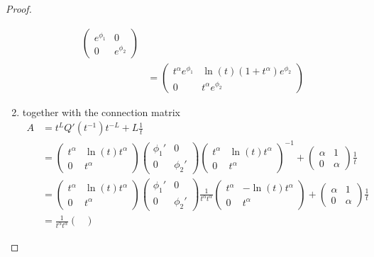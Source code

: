 \begin{proof}
\begin{enumerate}
\begin{align*}
\begin{pmatrix}
          e^{\phi_1} & 0 \\ 0 & e^{\phi_2}
        \end{pmatrix}
        \\&=\begin{pmatrix}
          t^\alpha e^{\phi_1} & \ln(t)(1+t^\alpha)e^{\phi_2}
          \\0 & t^\alpha e^{\phi_2}
        \end{pmatrix}
      \end{align*}
    \item together with the connection matrix
      \begin{align*}
        A&=t^LQ'(t^{-1})t^{-L}+L\frac{1}{t}
        \\&= \begin{pmatrix}
          t^\alpha & \ln(t)t^\alpha
          \\0 & t^\alpha
        \end{pmatrix} \begin{pmatrix}
          \phi_1' & 0 \\ 0 & \phi_2'
        \end{pmatrix} \begin{pmatrix}
          t^\alpha & \ln(t)t^\alpha
          \\0 & t^\alpha
        \end{pmatrix}^{-1}
        +
        \begin{pmatrix} \alpha & 1 \\ 0 & \alpha \end{pmatrix} \frac{1}{t}
        \\&= \begin{pmatrix}
          t^\alpha & \ln(t)t^\alpha
          \\0 & t^\alpha
        \end{pmatrix} \begin{pmatrix}
          \phi_1' & 0 \\ 0 & \phi_2'
        \end{pmatrix} 
        \frac{1}{t^\alpha t^\alpha}
        \begin{pmatrix}
          t^\alpha & -\ln(t)t^\alpha
          \\ 0 & t^\alpha
        \end{pmatrix}
        +
        \begin{pmatrix} \alpha & 1 \\ 0 & \alpha \end{pmatrix} \frac{1}{t}
        \\&= \frac{1}{t^\alpha t^\alpha} \begin{pmatrix}

\end{pmatrix}
\end{align*}
\end{enumerate}
\end{proof}
